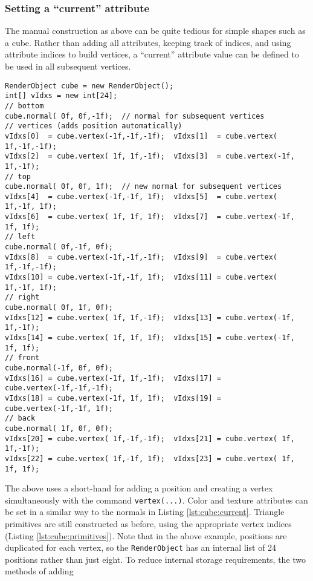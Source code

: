 \documentclass{article}
\begin{document}
\subsubsection{Setting a ``current'' attribute}

The manual construction as above can be quite tedious for simple shapes such as a cube.
Rather than adding all attributes, keeping track of indices, and using attribute indices
to build vertices, a ``current'' attribute value can be defined to be used in all subsequent 
vertices.
\begin{lstlisting}[caption={Construction of a cube using current attributes},label=lst:cube:current]
RenderObject cube = new RenderObject();
int[] vIdxs = new int[24];
// bottom
cube.normal( 0f, 0f,-1f);  // normal for subsequent vertices
// vertices (adds position automatically)
vIdxs[0]  = cube.vertex(-1f,-1f,-1f);  vIdxs[1]  = cube.vertex( 1f,-1f,-1f);
vIdxs[2]  = cube.vertex( 1f, 1f,-1f);  vIdxs[3]  = cube.vertex(-1f, 1f,-1f);
// top
cube.normal( 0f, 0f, 1f);  // new normal for subsequent vertices
vIdxs[4]  = cube.vertex(-1f,-1f, 1f);  vIdxs[5]  = cube.vertex( 1f,-1f, 1f);
vIdxs[6]  = cube.vertex( 1f, 1f, 1f);  vIdxs[7]  = cube.vertex(-1f, 1f, 1f);
// left
cube.normal( 0f,-1f, 0f);
vIdxs[8]  = cube.vertex(-1f,-1f,-1f);  vIdxs[9]  = cube.vertex( 1f,-1f,-1f);
vIdxs[10] = cube.vertex(-1f,-1f, 1f);  vIdxs[11] = cube.vertex( 1f,-1f, 1f);
// right
cube.normal( 0f, 1f, 0f);
vIdxs[12] = cube.vertex( 1f, 1f,-1f);  vIdxs[13] = cube.vertex(-1f, 1f,-1f);
vIdxs[14] = cube.vertex( 1f, 1f, 1f);  vIdxs[15] = cube.vertex(-1f, 1f, 1f);
// front
cube.normal(-1f, 0f, 0f);
vIdxs[16] = cube.vertex(-1f, 1f,-1f);  vIdxs[17] = cube.vertex(-1f,-1f,-1f);
vIdxs[18] = cube.vertex(-1f, 1f, 1f);  vIdxs[19] = cube.vertex(-1f,-1f, 1f);
// back
cube.normal( 1f, 0f, 0f);
vIdxs[20] = cube.vertex( 1f,-1f,-1f);  vIdxs[21] = cube.vertex( 1f, 1f,-1f);
vIdxs[22] = cube.vertex( 1f,-1f, 1f);  vIdxs[23] = cube.vertex( 1f, 1f, 1f);
\end{lstlisting}
The above uses a short-hand for adding a position and creating a vertex simultaneously
with the command \lstinline{vertex(...)}. Color and texture attributes can be 
set in a similar way to the normals in Listing \ref{lst:cube:current}.  Triangle primitives are 
still constructed as before, using the appropriate vertex indices (Listing \ref{lst:cube:primitives}).
Note that in the above example, positions are duplicated for each vertex, so the
\lstinline{RenderObject} has an internal list of 24 positions rather than just
eight.  To reduce internal storage requirements, the two methods of adding
\end{document}
